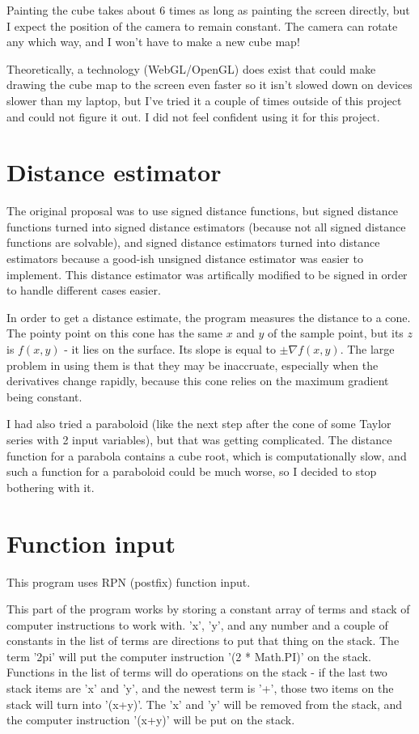 Painting the cube takes about 6 times as long as painting the screen directly, but I expect the position of the camera to remain constant.  The camera can rotate any which way, and I won't have to make a new cube map!

Theoretically, a technology (WebGL/OpenGL) does exist that could make drawing the cube map to the screen even faster so it isn't slowed down on devices slower than my laptop, but I've tried it a couple of times outside of this project and could not figure it out.  I did not feel confident using it for this project.

\section*{Distance estimator}

The original proposal was to use signed distance functions, but signed distance functions turned into signed distance estimators (because not all signed distance functions are solvable), and signed distance estimators turned into distance estimators because a good-ish unsigned distance estimator was easier to implement.  This distance estimator was artifically modified to be signed in order to handle different cases easier.

In order to get a distance estimate, the program measures the distance to a cone.  The pointy point on this cone has the same $x$ and $y$ of the sample point, but its $z$ is $f(x,y)$ - it lies on the surface.  Its slope is equal to $\pm\nabla f(x,y)$.  The large problem in using them is that they may be inaccruate, especially when the derivatives change rapidly, because this cone relies on the maximum gradient being constant.

I had also tried a paraboloid (like the next step after the cone of some Taylor series with 2 input variables), but that was getting complicated.  The distance function for a parabola contains a cube root, which is computationally slow, and such a function for a paraboloid could be much worse, so I decided to stop bothering with it.

\section*{Function input}

This program uses RPN (postfix) function input.

This part of the program works by storing a constant array of terms and stack of computer instructions to work with.  'x', 'y', and any number and a couple of constants in the list of terms are directions to put that thing on the stack.  The term '2pi' will put the computer instruction '(2 * Math.PI)' on the stack.  Functions in the list of terms will do operations on the stack - if the last two stack items are 'x' and 'y', and the newest term is '+', those two items on the stack will turn into '(x+y)'.  The 'x' and 'y' will be removed from the stack, and the computer instruction '(x+y)' will be put on the stack.

